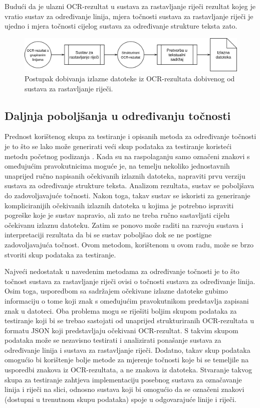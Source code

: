 \documentclass[times, utf8, zavrsni]{fer}
\begin{document}
Budući da je ulazni OCR-rezultat u sustava za rastavljanje riječi rezultat
kojeg je vratio sustav za određivanje linija, mjera točnosti sustava za
rastavljanje riječi je ujedno i mjera točnosti cijelog sustava za određivanje
strukture teksta zato.

\begin{figure}[htb]
    \centering
    \captionsetup{justification=centering,margin=2cm}
    \includegraphics[width=\textwidth]{images/sustav-05.png}
    \caption{
        Postupak dobivanja izlazne datoteke iz OCR-rezultata dobivenog od
        sustava za rastavljanje riječi.
    }
    \label{fig:sustav-05}
\end{figure}

\subsection{Daljnja poboljšanja u određivanju točnosti}
Prednost korištenog skupa za testiranje i opisanih metoda za određivanje
točnosti je to što se lako može generirati veći skup podataka za testiranje
koristeći metodu početnog podizanja . Kada su na
raspolaganju samo označeni znakovi s omeđujućim pravokutnicima moguće je, na
temelju nekoliko jednostavnih unaprijed ručno napisanih očekivanih izlaznih
datoteka, napraviti prvu verziju sustava za određivanje strukture teksta.
Analizom rezultata, sustav se poboljšava do zadovoljavajuće točnosti. Nakon
toga, takav sustav se iskoristi za generiranje kompliciranijih očekivanih
izlaznih datoteka u kojima je potrebno ispraviti pogreške koje je sustav
napravio, ali zato ne treba ručno sastavljati cijelu očekivanu izlaznu
datoteku. Zatim se ponovo može raditi na razvoju sustava i interpretaciji
rezultata da bi se sustav poboljšao dok se ne postigne zadovoljavajuća točnost.
Ovom metodom, korištenom u ovom radu, može se brzo stvoriti skup podataka za
testiranje.

Najveći nedostatak u navedenim metodama za određivanje točnosti je to što
točnost sustava za rastavljanje riječi ovisi o točnosti sustava za određivanje
linija. Osim toga, usporedbom sa sadržajem očekivane izlazne datoteke gubimo
informaciju o tome koji znak s omeđujućim pravokutnikom predstavlja zapisani
znak u datoteci. Oba problema mogu se riješiti boljim skupom podataka za
testiranje koji bi se trebao sastojati od unaprijed strukturiranih
OCR-rezultata u formatu JSON koji predstavljaju očekivani OCR-rezultat. S
takvim skupom podataka može se nezavisno testirati i analizirati ponašanje
sustava za određivanje linija i sustava za rastavljanje riječi. Dodatno, takav
skup podataka omogućio bi korištenje bolje metode za mjerenje točnosti koje bi
se temeljile na usporedbi znakova iz OCR-rezultata, a ne znakova iz datoteka.
Stvaranje takvog skupa za testiranje zahtjeva implementaciju posebnog sustava
za označavanje linija i riječi na slici, odnosno sustava koji bi omogućio da
se označeni znakovi (dostupni u trenutnom skupu podataka) spoje u odgovarajuće
linije i riječi.
\end{document}

